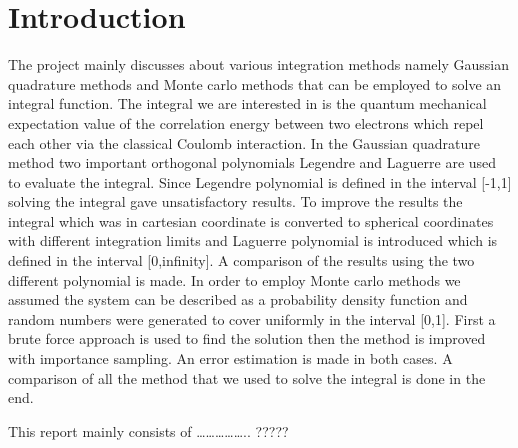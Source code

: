 \chapter{Introduction}

The project mainly discusses about various integration methods namely Gaussian quadrature methods and Monte carlo methods that can be employed to solve an integral function. The integral we are interested in is the quantum mechanical expectation value of the correlation energy between two electrons which repel each other via the classical Coulomb interaction. In the Gaussian quadrature method two important orthogonal polynomials Legendre and Laguerre are used to evaluate the integral. Since Legendre polynomial is defined in the interval [-1,1] solving the integral gave unsatisfactory results. To improve the results the integral which was in cartesian coordinate is converted to spherical coordinates with different integration limits and Laguerre polynomial is introduced which is defined in the interval [0,infinity]. A comparison of the results using the two different polynomial is made. In order to employ Monte carlo methods we assumed the system can be described as a probability density function and random numbers were generated to cover uniformly in the interval [0,1]. First a brute force approach is used to find the solution then the method is improved with importance sampling. An error estimation is made in both cases. A comparison of all the method that we used to solve the integral is done in the end.

This report mainly consists of …………….. ?????